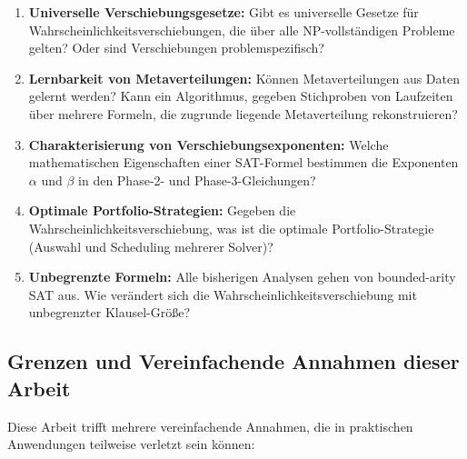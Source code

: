 ﻿\documentclass[a4paper,12pt]{article}
\theoremstyle{definition}
\begin{document}
\begin{enumerate}
	\item \textbf{Universelle Verschiebungsgesetze:} Gibt es universelle Gesetze für Wahrscheinlichkeitsverschiebungen, die über alle NP-vollständigen Probleme gelten? Oder sind Verschiebungen problemspezifisch?
	
	\item \textbf{Lernbarkeit von Metaverteilungen:} Können Metaverteilungen aus Daten gelernt werden? Kann ein Algorithmus, gegeben Stichproben von Laufzeiten über mehrere Formeln, die zugrunde liegende Metaverteilung rekonstruieren?
	
	\item \textbf{Charakterisierung von Verschiebungsexponenten:} Welche mathematischen Eigenschaften einer SAT-Formel bestimmen die Exponenten $\alpha$ und $\beta$ in den Phase-2- und Phase-3-Gleichungen?
	
	\item \textbf{Optimale Portfolio-Strategien:} Gegeben die Wahrscheinlichkeitsverschiebung, was ist die optimale Portfolio-Strategie (Auswahl und Scheduling mehrerer Solver)?
	
	\item \textbf{Unbegrenzte Formeln:} Alle bisherigen Analysen gehen von bounded-arity SAT aus. Wie verändert sich die Wahrscheinlichkeitsverschiebung mit unbegrenzter Klausel-Größe?
\end{enumerate}

\subsection{Grenzen und Vereinfachende Annahmen dieser Arbeit}

Diese Arbeit trifft mehrere vereinfachende Annahmen, die in praktischen Anwendungen teilweise verletzt sein können:
\end{document}
